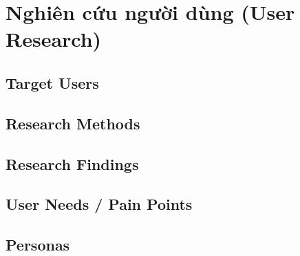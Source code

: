 \section{Nghiên cứu người dùng (User Research)}

\subsection{Target Users}

\subsection{Research Methods}

\subsection{Research Findings}

\subsection{User Needs / Pain Points}

\subsection{Personas}
